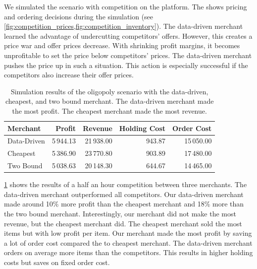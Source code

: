 We simulated the scenario with competition on the \pricewars platform.
The \ui shows pricing and ordering decisions during the simulation (see \cref{fig:competition_prices,fig:competition_inventory}).
The data-driven merchant learned the advantage of undercutting competitors' offers.
However, this creates a price war and offer prices decrease.
With shrinking profit margins, it becomes unprofitable to set the price below competitors' prices.
The data-driven merchant pushes the price up in such a situation.
This action is especially successful if the competitors also increase their offer prices.

\begin{table}[t]
	\centering
	\begin{tabular}{lrrrr}
		\toprule
		\textbf{Merchant} & \textbf{Profit} & \textbf{Revenue} & \textbf{Holding Cost} & \textbf{Order Cost} \\
		\midrule
		Data-Driven & 5\,944.13 & 21\,938.00 & 943.87 & 15\,050.00 \\
		Cheapest & 5\,386.90 & 23\,770.80 & 903.89 & 17\,480.00 \\
		Two Bound & 5\,038.63 & 20\,148.30 & 644.67 & 14\,465.00 \\
		\bottomrule
	\end{tabular}
	\caption{Simulation results of the oligopoly scenario with the data-driven, cheapest, and two bound merchant. The data-driven merchant made the most profit. The cheapest merchant made the most revenue.}
	\label{tab:competition}
\end{table}

\cref{tab:competition} shows the results of a half an hour competition between three merchants.
The data-driven merchant outperformed all competitors.
Our data-driven merchant made around 10\% more profit than the cheapest merchant and 18\% more than the two bound merchant.
Interestingly, our merchant did not make the most revenue, but the cheapest merchant did.
The cheapest merchant sold the most items but with low profit per item.
Our merchant made the most profit by saving a lot of order cost compared the to cheapest merchant.
The data-driven merchant orders on average more items than the competitors.
This results in higher holding costs but saves on fixed order cost.


